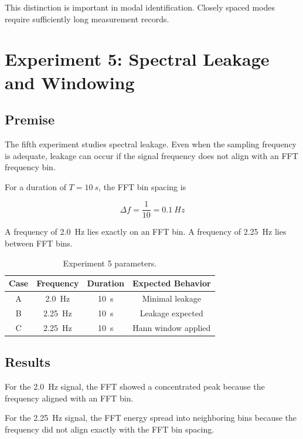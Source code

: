 \documentclass[11pt,a4paper]{article}
\begin{document}
This distinction is important in modal identification. Closely spaced modes require sufficiently long measurement records.

\section{Experiment 5: Spectral Leakage and Windowing}

\subsection{Premise}

The fifth experiment studies spectral leakage. Even when the sampling frequency is adequate, leakage can occur if the signal frequency does not align with an FFT frequency bin.

For a duration of \(T=\SI{10}{s}\), the FFT bin spacing is

\begin{equation}
\Delta f = \frac{1}{10} = \SI{0.1}{Hz}
\end{equation}

A frequency of \SI{2.0}{Hz} lies exactly on an FFT bin. A frequency of \SI{2.25}{Hz} lies between FFT bins.

\begin{table}[H]
\centering
\caption{Experiment 5 parameters.}
\label{tab:exp5_params}
\begin{tabular}{cccc}
\toprule
Case & Frequency & Duration & Expected Behavior \\
\midrule
A & \SI{2.0}{Hz} & \SI{10}{s} & Minimal leakage \\
B & \SI{2.25}{Hz} & \SI{10}{s} & Leakage expected \\
C & \SI{2.25}{Hz} & \SI{10}{s} & Hann window applied \\
\bottomrule
\end{tabular}
\end{table}

\subsection{Results}

For the \SI{2.0}{Hz} signal, the FFT showed a concentrated peak because the frequency aligned with an FFT bin.

For the \SI{2.25}{Hz} signal, the FFT energy spread into neighboring bins because the frequency did not align exactly with the FFT bin spacing.
\end{document}
